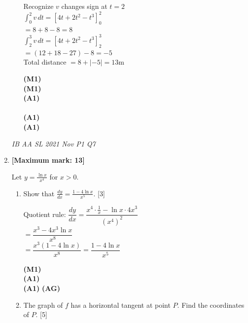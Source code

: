\documentclass[12pt, twoside]{article}
\begin{document}
\begin{enumerate}[itemsep=0.2cm]
\begin{enumerate}[itemsep=0.3cm]
  \begin{minipage}[t]{0.62\textwidth}
  Recognize $v$ changes sign at $t = 2$\\[0.15cm]
  $\displaystyle\int_0^2 v\,dt = \left[4t + 2t^2 - t^3\right]_0^2$\\[0.2cm]
  $= 8 + 8 - 8 = 8$\\[0.15cm]
  $\displaystyle\int_2^3 v\,dt = \left[4t + 2t^2 - t^3\right]_2^3$\\[0.2cm]
  $= (12 + 18 - 27) - 8 = -5$\\[0.15cm]
  Total distance $= 8 + |-5| = 13$\;m
  \end{minipage}%
  \begin{minipage}[t]{0.35\textwidth}\raggedleft
  \textbf{(M1)}\\[0.15cm]
  \textbf{(M1)}\\[0.2cm]
  \textbf{(A1)}\\[0.15cm]
  ~\\[0.2cm]
  \textbf{(A1)}\\[0.15cm]
  \textbf{(A1)}
  \end{minipage}
\end{enumerate}

\hfill \emph{IB AA SL 2021 Nov P1 Q7}

\newpage
\item \textbf{[Maximum mark: 13]}

Let $\displaystyle y = \frac{\ln x}{x^4}$ for $x > 0$.

\begin{enumerate}[itemsep=0.3cm]
  \item Show that $\displaystyle \frac{dy}{dx} = \frac{1 - 4\ln x}{x^5}$. \hfill [3]

  \begin{minipage}[t]{0.62\textwidth}
  Quotient rule: $\dfrac{dy}{dx} = \dfrac{x^4 \cdot \frac{1}{x} - \ln x \cdot 4x^3}{(x^4)^2}$\\[0.3cm]
  $= \dfrac{x^3 - 4x^3 \ln x}{x^8}$\\[0.2cm]
  $= \dfrac{x^3(1 - 4\ln x)}{x^8} = \dfrac{1 - 4\ln x}{x^5}$
  \end{minipage}%
  \begin{minipage}[t]{0.35\textwidth}\raggedleft
  \textbf{(M1)}\\[0.3cm]
  \textbf{(A1)}\\[0.2cm]
  \textbf{(A1)} \textbf{(AG)}
  \end{minipage}

  \bigskip
  \item The graph of $f$ has a horizontal tangent at point $P$.
        Find the coordinates of $P$. \hfill [5]


\end{enumerate}
\end{enumerate}
\end{document}
